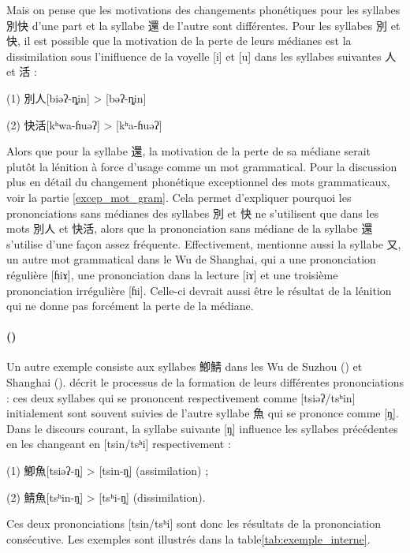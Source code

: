 \documentclass{scrbook}
\newcounter{c}[subsubsection]
\newcommand{\stpc}[1]{\stepcounter{#1}}
\newcommand{\illustre}{Les exemples sont illustrés dans la table\xspace}
\begin{document}
\begin{sloppypar}
Mais on pense que les motivations des changements phonétiques pour les syllabes 別快 d'une part et la syllabe 還 de l'autre sont différentes. Pour les syllabes 別 et 快, il est possible que la motivation de la perte de leurs médianes est la dissimilation sous l'inifluence de la voyelle [i] et [u] dans les syllabes suivantes 人 et 活 : 

(1) 別人[biəʔ-ȵin] > [bəʔ-ȵin]

(2) 快活[kʰwa-ɦuəʔ] > [kʰa-ɦuəʔ]

Alors que pour la syllabe 還, la motivation de la perte de sa médiane serait plutôt la lénition à force d'usage comme un mot grammatical. Pour la discussion plus en détail du changement phonétique exceptionnel des mots grammaticaux, voir la partie \ref{excep_mot_gram}. Cela permet d'expliquer pourquoi les prononciations sans médianes des syllabes 別 et 快 ne s'utilisent que dans les mots 別人 et 快活, alors que la prononciation sans médiane de la syllabe 還 s'utilise d'une façon assez fréquente. Effectivement, \textcite[134]{Shen1988shanghai} mentionne aussi la syllabe 又, un autre mot grammatical dans le Wu de Shanghai, qui a une prononciation régulière [ɦiɤ], une prononciation dans la lecture [iɤ] et une troisième prononciation irrégulière [ɦi]. Celle-ci devrait aussi être le résultat de la lénition qui ne donne pas forcément la perte de la médiane.

\stpc{c}\paragraph{()}
Un autre exemple consiste aux syllabes 鯽鯖 dans les Wu de Suzhou (\cite[26]{Ye1988suzhou}) et Shanghai (\cite[134--135]{Shen1988shanghai}). \textcite[134--135]{Shen1988shanghai} décrit le processus de la formation de leurs différentes prononciations : ces deux syllabes qui se prononcent respectivement comme [tsiəʔ/tsʰin] initialement sont souvent suivies de l'autre syllabe 魚 qui se prononce comme [ŋ̩]. Dans le discours courant, la syllabe suivante [ŋ̩] influence les syllabes précédentes en les changeant en [tsin/tsʰi] respectivement : 

(1) 鯽魚[tsiəʔ-ŋ̩] > [tsin-ŋ̩] (assimilation) ;  

(2) 鯖魚[tsʰin-ŋ̩] > [tsʰi-ŋ̩] (dissimilation). 

\noindent Ces deux prononciations [tsin/tsʰi] sont donc les résultats de la prononciation consécutive. \illustre \ref{tab:exemple_interne}.


\end{sloppypar}
\end{document}
